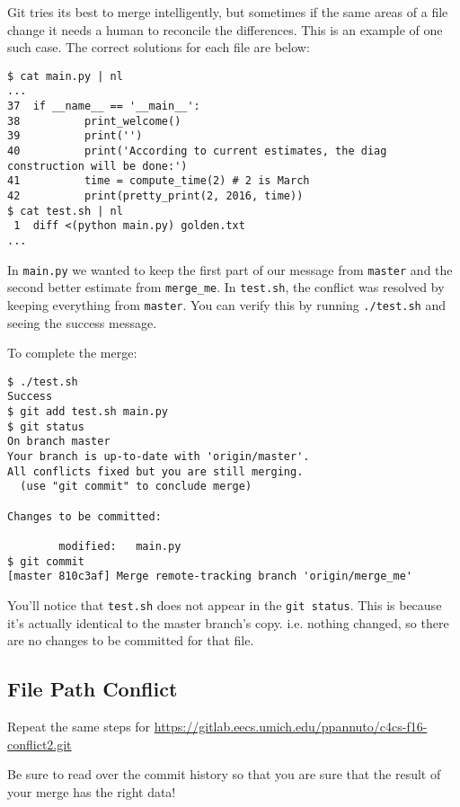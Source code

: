 \documentclass{article}
\begin{document}
{    Git tries its best to merge intelligently, but sometimes if the same areas
    of a file change it needs a human to reconcile the differences. This is an
    example of one such case. The correct solutions for each file are below:

    \begin{verbatim}
$ cat main.py | nl
...
37  if __name__ == '__main__':
38          print_welcome()
39          print('')
40          print('According to current estimates, the diag construction will be done:')
41          time = compute_time(2) # 2 is March
42          print(pretty_print(2, 2016, time))
$ cat test.sh | nl
 1  diff <(python main.py) golden.txt
...
    \end{verbatim}

    In \texttt{main.py} we wanted to keep the first part of our message from
    \texttt{master} and the second better estimate from \texttt{merge\_me}. In
    \texttt{test.sh}, the conflict was resolved by keeping everything from
    \texttt{master}. You can verify this by running \texttt{./test.sh} and
    seeing the success message.

    To complete the merge:

    \begin{verbatim}
$ ./test.sh
Success
$ git add test.sh main.py
$ git status
On branch master
Your branch is up-to-date with 'origin/master'.
All conflicts fixed but you are still merging.
  (use "git commit" to conclude merge)

Changes to be committed:

        modified:   main.py
$ git commit
[master 810c3af] Merge remote-tracking branch 'origin/merge_me'
    \end{verbatim}

    You'll notice that \texttt{test.sh} does not appear in the \texttt{git
    status}. This is because it's actually identical to the master branch's
    copy. i.e. nothing changed, so there are no changes to be committed for that
    file.
}

\newpage
\subsection{File Path Conflict}

Repeat the same steps for
\url{https://gitlab.eecs.umich.edu/ppannuto/c4cs-f16-conflict2.git}

Be sure to read over the commit history so that you are sure that the result
of your merge has the right data!
\end{document}
